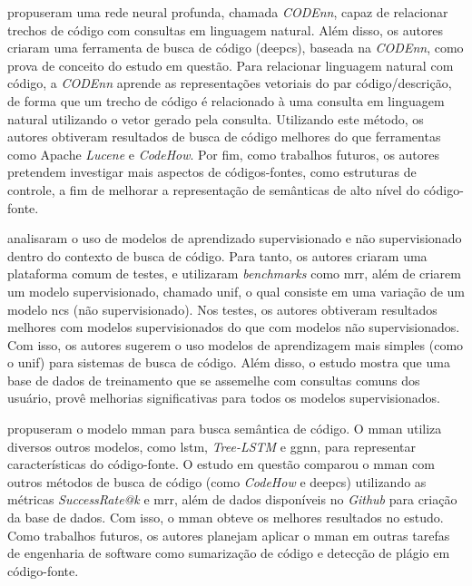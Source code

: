 \textcite{Gu2018DeepCS} propuseram uma rede neural profunda, chamada \textit{CODEnn}, capaz de relacionar trechos de código com consultas em linguagem natural. Além disso, os autores criaram uma ferramenta de busca de código (\gls{deepcs}), baseada na \textit{CODEnn}, como prova de conceito do estudo em questão. Para relacionar linguagem natural com código, a \textit{CODEnn} aprende as representações vetoriais do par código/descrição, de forma que um trecho de código é relacionado à uma consulta em linguagem natural utilizando o vetor gerado pela consulta. Utilizando este método, os autores obtiveram resultados de busca de código melhores do que ferramentas como Apache \textit{Lucene} e \textit{CodeHow}. Por fim, como trabalhos futuros, os autores pretendem investigar mais aspectos de códigos-fontes, como estruturas de controle, a fim de melhorar a representação de semânticas de alto nível do código-fonte.

\textcite{Cambronero2019WhenDL} analisaram o uso de modelos de aprendizado supervisionado e não supervisionado dentro do contexto de busca de código. Para tanto, os autores criaram uma plataforma comum de testes, e utilizaram \textit{benchmarks} como \gls{mrr}, além de criarem um modelo supervisionado, chamado \gls{unif}, o qual consiste em uma variação de um modelo \gls{ncs} (não supervisionado). Nos testes, os autores obtiveram resultados melhores com modelos supervisionados do que com modelos não supervisionados. Com isso, os autores sugerem o uso modelos de aprendizagem mais simples (como o \gls{unif}) para sistemas de busca de código. Além disso, o estudo mostra que uma base de dados de treinamento que se assemelhe com consultas comuns dos usuário, provê melhorias significativas para todos os modelos supervisionados.

\textcite{Wan2019MultimodalAN} propuseram o modelo \gls{mman} para busca semântica de código. O \gls{mman} utiliza diversos outros modelos, como \gls{lstm}, \textit{Tree-LSTM} e \gls{ggnn}, para representar características do código-fonte. O estudo em questão comparou o \gls{mman} com outros métodos de busca de código (como \textit{CodeHow} e \gls{deepcs}) utilizando as métricas \textit{SuccessRate@k} e \gls{mrr}, além de dados disponíveis no \textit{Github} para criação da base de dados. Com isso, o \gls{mman} obteve os melhores resultados no estudo. Como trabalhos futuros, os autores planejam aplicar o \gls{mman} em outras tarefas de engenharia de software como sumarização de código e detecção de plágio em código-fonte.

